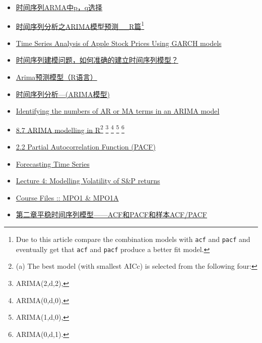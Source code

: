 \documentclass[]{tufte-book}
\providecommand{\tightlist}{%
  \setlength{\itemsep}{0pt}\setlength{\parskip}{0pt}}
\begin{document}
\begin{itemize}
\tightlist
\item
  \href{http://blog.csdn.net/xiaodongxiexie/article/details/54633272?locationNum=2\&fps=1}{{时间序列ARMA中p，q选择}}
\item
  \href{http://www.cnblogs.com/bicoffee/p/3838049.html}{时间序列分析之ARIMA模型预测\_\_R篇}\footnote{Due
    to this article compare the combination models with \texttt{acf} and
    \texttt{pacf} and eventually get that \texttt{acf} and \texttt{pacf}
    produce a better fit model.}
\item
  \href{https://rstudio-pubs-static.s3.amazonaws.com/258811_b43d4c7bb2c74851b5b95f29a09c5b30.html}{{Time
  Series Analysis of Apple Stock Prices Using GARCH models}}
\item
  \href{https://www.zhihu.com/question/31833683/answer/116155144}{{时间序列建模问题，如何准确的建立时间序列模型？}}
\item
  \href{http://blog.csdn.net/desilting/article/details/39013825}{{Arima预测模型（R语言）}}
\item
  \href{http://zhoulili1987619126.lofter.com/post/1cc8f7a3_74e7f10}{时间序列分析---(ARIMA模型)}
\item
  \href{http://people.duke.edu/~rnau/411arim3.htm}{{Identifying the
  numbers of AR or MA terms in an ARIMA model}}
\item
  \href{https://www.otexts.org/fpp/8/7}{{8.7 ARIMA modelling in
  R}}\footnote{(a) The best model (with smallest AICc) is selected from
    the following four:} \footnote{ARIMA(2,d,2),} \footnote{ARIMA(0,d,0),}
  \footnote{ARIMA(1,d,0),} \footnote{ARIMA(0,d,1).}
\item
  \href{https://onlinecourses.science.psu.edu/stat510/node/62}{{2.2
  Partial Autocorrelation Function (PACF)}}
\item
  \href{http://ptrckprry.com/course/forecasting/lecture/archfit.html}{{Forecasting
  Time Series}}
\item
  \href{https://klein.uk/teaching/quant2/docs/Lec4.html}{{Lecture 4:
  Modelling Volatility of S\&P returns}}
\item
  \href{https://github.com/mfrmn/qrm/blob/master/MPO1A/L2E2Ascript.r}{{Course
  Files :: MPO1 \& MPO1A}}
\item
  \href{http://www.cnblogs.com/xuanlvshu/p/5410721.html}{{第二章平稳时间序列模型------ACF和PACF和样本ACF/PACF}}
\end{itemize}
\end{document}
